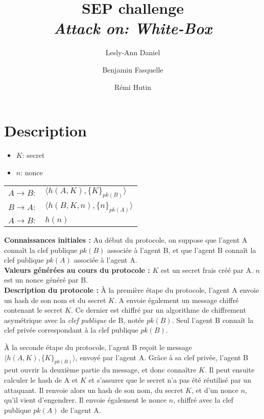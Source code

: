 \documentclass[10pt,a4paper]{article}
\author{Lesly-Ann Daniel \and Benjamin Fasquelle \and Rémi Hutin}
\title{
SEP challenge\\
\em Attack on: White-Box
}
\begin{document}
\maketitle


\section{Description}


\begin{itemize}
\item $K$: secret
\item $n$: nonce
\end{itemize}

\begin{table}[!h]
\centering
\begin{tabular}{ll}
$A \rightarrow B:$ & $\langle h(A, K), \{K\}_{pk(B)} \rangle $ \\
$B \rightarrow A:$ & $\langle h(B, K, n), \{n\}_{pk(A)} \rangle $\\
$A \rightarrow B:$ & $h(n)$\\
\end{tabular}
\end{table}

\textbf{Connaissances initiales :} 
Au début du protocole, on suppose que l'agent A connaît la clef publique $pk(B)$ associée à l'agent B,
et que l'agent B connaît la clef publique $pk(A)$ associée à l'agent A. \\

\textbf{Valeurs générées au cours du protocole :} 
$K$ est un secret frais créé par A.
$n$ est un nonce généré par B.\\

\textbf{Description du protocole :}
À la première étape du protocole, l'agent A envoie un hash de son nom et du secret $K$. 
A envoie également un message chiffré contenant le secret $K$. 
Ce dernier est chiffré par un algorithme de chiffrement asymétrique avec la \emph{clef publique} de B, notée $pk(B)$.
Seul l'agent B connaît la clef privée correspondant à la clef publique $pk(B)$. 

À la seconde étape du protocole, l'agent B reçoit le message $\langle h(A, K), \{K\}_{pk(B)} \rangle $, envoyé par l'agent A.
Grâce à sa clef privée, l'agent B peut ouvrir la deuxième partie du message, et donc connaître $K$.
Il peut ensuite calculer le hash de A et $K$ et s'assurer que le secret n'a pas été réutilisé par un attaquant.
Il renvoie alors un hash de son nom, du secret $K$, et d'un nonce $n$, qu'il vient d'engendrer.
Il envoie également le nonce $n$, chiffré avec la clef publique $pk(A)$ de l'agent A.
\end{document}
